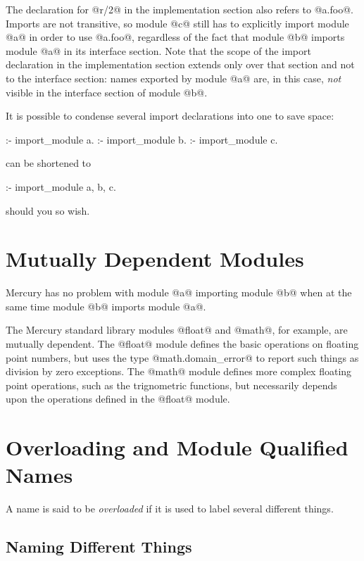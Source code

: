 The declaration for @r/2@ in the implementation section also refers to
@a.foo@.  Imports are not transitive, so module @c@ still has to
explicitly import module @a@ in order to use @a.foo@, regardless of the
fact that module @b@ imports module @a@ in its interface section.  Note
that the scope of the import declaration in the implementation section
extends only over that section and not to the interface section: names
exported by module @a@ are, in this case, \emph{not} visible in the
interface section of module @b@.

It is possible to condense several import declarations into one to save
space:
\begin{myverbatim}
:- import_module a.
:- import_module b.
:- import_module c.
\end{myverbatim}
can be shortened to
\begin{myverbatim}
:- import_module a, b, c.
\end{myverbatim}
should you so wish.


\section{Mutually Dependent Modules}

Mercury has no problem with module @a@ importing module @b@ when at the
same time module @b@ imports module @a@.

The Mercury standard library modules @float@ and @math@, for example,
are mutually dependent.  The @float@ module defines the basic operations
on floating point numbers, but uses the type @math.domain_error@ to
report such things as division by zero exceptions.  The @math@ module
defines more complex floating point operations, such as the trignometric
functions, but necessarily depends upon the operations defined in the
@float@ module.

\section{Overloading and Module Qualified Names}

A name is said to be \emph{overloaded} if it is used to label several
different things.

\subsection{Naming Different Things}

